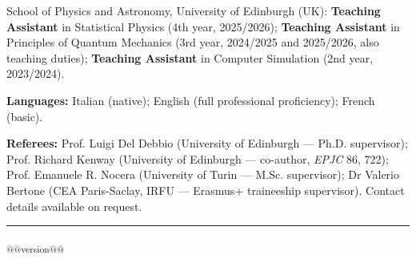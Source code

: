 \documentclass[10pt,a4paper]{article}
\begin{document}
\begin{cvlist}
\end{cvlist}

\begin{cvlist}
\end{cvlist}

\begin{cvlist}
  \item[] School of Physics and Astronomy, University of Edinburgh (UK):
    \textbf{Teaching Assistant} in Statistical Physics (4th year, 2025/2026);
    \textbf{Teaching Assistant} in Principles of Quantum Mechanics (3rd year, 2024/2025 and 2025/2026,
    also teaching duties);
    \textbf{Teaching Assistant} in Computer Simulation (2nd year, 2023/2024).
\end{cvlist}

\begin{cvlist}
\end{cvlist}

\begin{cvlist}
  \item[] \textbf{Languages:} Italian (native); English (full professional proficiency); French (basic).
  \item[] \textbf{Referees:}
    Prof. Luigi Del Debbio (University of Edinburgh — Ph.D. supervisor);
    Prof. Richard Kenway (University of Edinburgh — co-author, \textit{EPJC} 86, 722);
    Prof. Emanuele R. Nocera (University of Turin — M.Sc. supervisor);
    Dr Valerio Bertone (CEA Paris-Saclay, IRFU — Erasmus+ traineeship supervisor).
    Contact details available on request.
\end{cvlist}

\vfill\hrule
\begin{description}\item
            {{\textsubscript{@@version@@}}}
\end{description}
\end{document}
